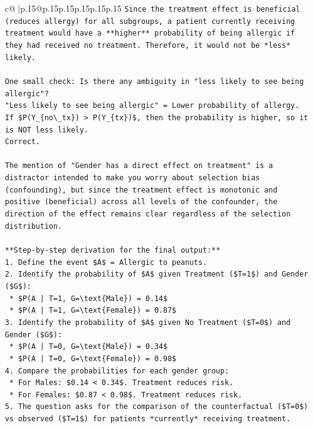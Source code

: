 \documentclass{article}
\begin{document}
{\begin{supertabular}{c@{$\;$}|p{.15\linewidth}@{}p{.15\linewidth}p{.15\linewidth}p{.15\linewidth}p{.15\linewidth}p{.15\linewidth}}
{{{\texttt{Since the treatment effect is beneficial (reduces allergy) for all subgroups, a patient currently receiving treatment would have a **higher** probability of being allergic if they had received no treatment. Therefore, it would not be *less* likely.} \\
\\ 
\texttt{One small check: Is there any ambiguity in "less likely to see being allergic"?} \\
\texttt{"Less likely to see being allergic" = Lower probability of allergy.} \\
\texttt{If \$P(Y\_\{no\textbackslash{}\_tx\}) > P(Y\_\{tx\})\$, then the probability is higher, so it is NOT less likely.} \\
\texttt{Correct.} \\
\\ 
\texttt{The mention of "Gender has a direct effect on treatment" is a distractor intended to make you worry about selection bias (confounding), but since the treatment effect is monotonic and positive (beneficial) across all levels of the confounder, the direction of the effect remains clear regardless of the selection distribution.} \\
\\ 
\texttt{**Step{-}by{-}step derivation for the final output:**} \\
\texttt{1.  Define the event \$A\$ = Allergic to peanuts.} \\
\texttt{2.  Identify the probability of \$A\$ given Treatment (\$T=1\$) and Gender (\$G\$):} \\
\texttt{    *   \$P(A | T=1, G=\textbackslash{}text\{Male\}) = 0.14\$} \\
\texttt{    *   \$P(A | T=1, G=\textbackslash{}text\{Female\}) = 0.87\$} \\
\texttt{3.  Identify the probability of \$A\$ given No Treatment (\$T=0\$) and Gender (\$G\$):} \\
\texttt{    *   \$P(A | T=0, G=\textbackslash{}text\{Male\}) = 0.34\$} \\
\texttt{    *   \$P(A | T=0, G=\textbackslash{}text\{Female\}) = 0.98\$} \\
\texttt{4.  Compare the probabilities for each gender group:} \\
\texttt{    *   For Males: \$0.14 < 0.34\$. Treatment reduces risk.} \\
\texttt{    *   For Females: \$0.87 < 0.98\$. Treatment reduces risk.} \\
\texttt{5.  The question asks for the comparison of the counterfactual (\$T=0\$) vs observed (\$T=1\$) for patients *currently* receiving treatment.} \\
}}}
\end{supertabular}}
\end{document}
